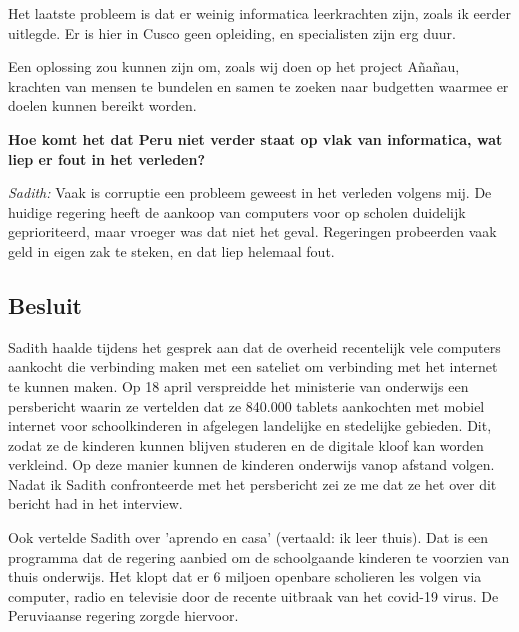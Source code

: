 Het laatste probleem is dat er weinig informatica leerkrachten zijn, zoals ik eerder uitlegde. Er is hier in Cusco geen opleiding, en specialisten zijn erg duur.

Een oplossing zou kunnen zijn om, zoals wij doen op het project Añañau, krachten van mensen te bundelen en samen te zoeken naar budgetten waarmee er doelen kunnen bereikt worden. 

\textbf{Hoe komt het dat Peru niet verder staat op vlak van informatica, wat liep er fout in het verleden?}

\textit{Sadith:} Vaak is corruptie een probleem geweest in het verleden volgens mij. De huidige regering heeft de aankoop van computers voor op scholen duidelijk geprioriteerd, maar vroeger was dat niet het geval. Regeringen probeerden vaak geld in eigen zak te steken, en dat liep helemaal fout. 
 
\subsection{Besluit}
Sadith haalde tijdens het gesprek aan dat de overheid recentelijk vele computers aankocht die verbinding maken met een sateliet om verbinding met het internet te kunnen maken. Op 18 april verspreidde het ministerie van onderwijs een persbericht waarin ze vertelden dat ze 840.000 tablets aankochten met mobiel internet voor schoolkinderen in afgelegen landelijke en stedelijke gebieden. Dit, zodat ze de kinderen kunnen blijven studeren en de digitale kloof kan worden verkleind. Op deze manier kunnen de kinderen onderwijs vanop afstand volgen.\autocite{Minedu2020} Nadat ik Sadith confronteerde met het persbericht zei ze me dat ze het over dit bericht had in het interview. 

Ook vertelde Sadith over 'aprendo en casa' (vertaald: ik leer thuis). Dat is een programma dat de regering aanbied om de schoolgaande kinderen te voorzien van thuis onderwijs. Het klopt dat er 6 miljoen openbare scholieren les volgen via computer, radio en televisie door de recente uitbraak van het covid-19 virus. De Peruviaanse regering zorgde hiervoor. \autocite{Minedu2020a}

